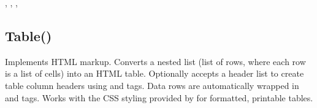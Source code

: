 \documentclass[letterpaper,10pt,english]{sphinxmanual}
\begin{document}
\sphinxAtStartPar
{}

\begin{sphinxVerbatim}[commandchars=\\\{\}]
\PYG{p}{[}\PYG{p}{]}

\end{sphinxVerbatim}

\sphinxAtStartPar
{}

\sphinxAtStartPar
{}, , , 

\ignorespaces 

\subsection{Table()}
\label{\detokenize{reference/html:table}}\label{\detokenize{reference/html:index-11}}
\sphinxAtStartPar
{}

\sphinxAtStartPar
Implements HTML  markup. Converts a nested list (list of rows, where each row is a list of cells) into an HTML table. Optionally accepts a header list to create table column headers using  and  tags. Data rows are automatically wrapped in  and  tags. Works with the CSS styling provided by  for formatted, printable tables.
\end{document}
